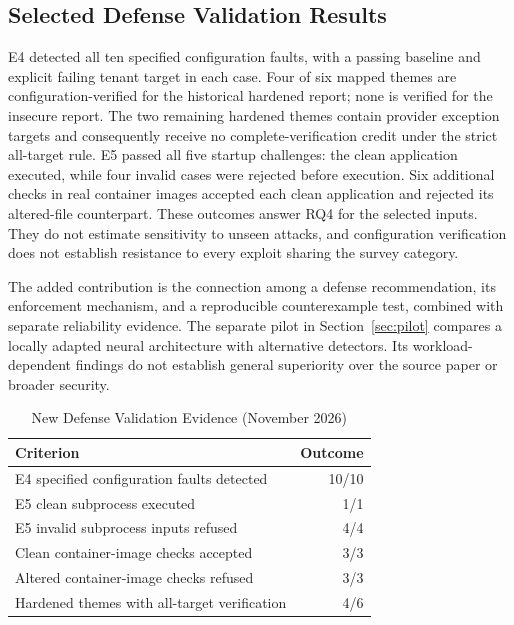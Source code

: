 \documentclass[conference,letterpaper]{IEEEtran}
\begin{document}
\subsection{Selected Defense Validation Results}
E4 detected all ten specified configuration faults, with a passing baseline and explicit failing tenant target in each case. Four of six mapped themes are configuration-verified for the historical hardened report; none is verified for the insecure report. The two remaining hardened themes contain provider exception targets and consequently receive no complete-verification credit under the strict all-target rule. E5 passed all five startup challenges: the clean application executed, while four invalid cases were rejected before execution. Six additional checks in real container images accepted each clean application and rejected its altered-file counterpart. These outcomes answer RQ4 for the selected inputs. They do not estimate sensitivity to unseen attacks, and configuration verification does not establish resistance to every exploit sharing the survey category.

The added contribution is the connection among a defense recommendation, its enforcement mechanism, and a reproducible counterexample test, combined with separate reliability evidence. The separate pilot in Section~\ref{sec:pilot} compares a locally adapted neural architecture with alternative detectors. Its workload-dependent findings do not establish general superiority over the source paper or broader security.

\begin{table}[t]
\caption{New Defense Validation Evidence (November 2026)}
\label{tab:newdefenses}
\centering
\footnotesize
\renewcommand{\arraystretch}{1.15}
\begin{tabular}{@{}p{}r@{}}
\toprule
Criterion & Outcome \\ \midrule
E4 specified configuration faults detected & 10/10 \\
E5 clean subprocess executed & 1/1 \\
E5 invalid subprocess inputs refused & 4/4 \\
Clean container-image checks accepted & 3/3 \\
Altered container-image checks refused & 3/3 \\
Hardened themes with all-target verification & 4/6 \\
\bottomrule
\end{tabular}
\end{table}
\end{document}
